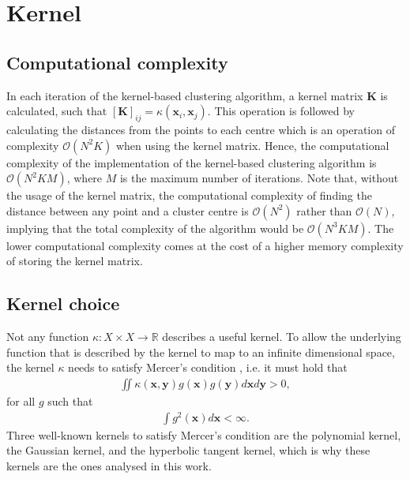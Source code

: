 \newpage

\section{Kernel}\label{appendix:kernel}

\subsection{Computational complexity}
In each iteration of the kernel-based clustering algorithm, a kernel matrix $\mathbf{K}$ is calculated, such that $[\mathbf{K}]_{ij} = \kappa(\textbf{x}_i, \textbf{x}_j)$. This operation is followed by calculating the distances from the points to each centre which is an operation of complexity  $\mathcal{O}(N^2K)$ when using the kernel matrix. Hence, the computational complexity of the implementation of the kernel-based clustering algorithm is $\mathcal{O}(N^2KM)$, where $M$ is the maximum number of iterations. Note that, without the usage of the kernel matrix, the computational complexity of finding the distance between any point and a cluster centre is $\mathcal{O}(N^2)$ rather than $\mathcal{O}(N)$, implying that the total complexity of the algorithm would be $\mathcal{O}(N^3KM).$ The lower computational complexity comes at the cost of a higher memory complexity of storing the kernel matrix.

\subsection{Kernel choice}

Not any function $\kappa: X \times X \to \mathbb{R}$ describes a useful kernel. To allow the underlying function that is described by the kernel to map to an infinite dimensional space, the kernel $\kappa$ needs to satisfy Mercer's condition \citep{cortes1995support}, i.e. it must hold that 
\begin{align*}
    \iint \kappa(\textbf{x}, \textbf{y}) g(\textbf{x}) g(\textbf{y}) d \textbf{x} d\textbf{y} > 0,
\end{align*}
for all $g$ such that
\begin{align*}
    \int g^2(\textbf{x})d\textbf{x} < \infty.
\end{align*}
Three well-known kernels to satisfy Mercer's condition are the polynomial kernel, the Gaussian kernel, and the hyperbolic tangent kernel, which is why these kernels are the ones analysed in this work. 

